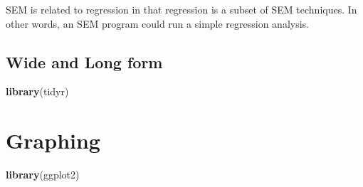 \documentclass[]{book}
\newenvironment{Shaded}{\begin{snugshade}}{\end{snugshade}}
\newcommand{\KeywordTok}[1]{\textcolor[rgb]{0.13,0.29,0.53}{\textbf{{#1}}}}
\newcommand{\NormalTok}[1]{{#1}}
\begin{document}
SEM is related to regression in that regression is a subset of SEM
techniques. In other words, an SEM program could run a simple regression
analysis.

\subsection{Wide and Long form}\label{wide-and-long-form}

\begin{Shaded}
\begin{Highlighting}[]
\KeywordTok{library}\NormalTok{(tidyr)}
\end{Highlighting}
\end{Shaded}

\section{Graphing}\label{graphing}

\begin{Shaded}
\begin{Highlighting}[]
\KeywordTok{library}\NormalTok{(ggplot2)}
\end{Highlighting}
\end{Shaded}


\end{document}
